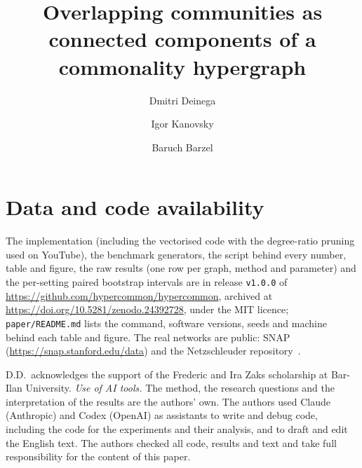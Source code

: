 \documentclass[pre,twocolumn,superscriptaddress,longbibliography,nofootinbib,floatfix]{revtex4-2}
\begin{document}
\title{Overlapping communities as connected components of a commonality hypergraph}

\author{Dmitri Deinega}
\author{Igor Kanovsky}
\author{Baruch Barzel}

\begin{abstract}

\end{abstract}

\maketitle










\section*{Data and code availability}
The implementation (including the vectorised code with the degree-ratio pruning used on
YouTube), the benchmark generators, the script behind every number, table and figure,
the raw results (one row per graph, method and parameter) and the per-setting paired
bootstrap intervals are in release \texttt{v1.0.0} of
\url{https://github.com/hypercommon/hypercommon}, archived at
\url{https://doi.org/10.5281/zenodo.24392728}, under the MIT licence;
\texttt{paper/README.md} lists the command, software versions, seeds and machine behind each table and figure.
The real networks are
public: SNAP (\url{https://snap.stanford.edu/data}) and the Netzschleuder
repository~\cite{peixoto2020netzschleuder}.

\begin{acknowledgments}
D.D.\ acknowledges the support of the Frederic and Ira Zaks scholarship at Bar-Ilan
University.
\emph{Use of AI tools.} The method, the research questions and the interpretation of the
results are the authors' own. The authors used Claude (Anthropic) and Codex (OpenAI) as
assistants to write and debug code, including the code for the experiments and their
analysis, and to draft and edit the English text. The authors checked all code, results
and text and take full responsibility for the content of this paper.
\end{acknowledgments}

\FloatBarrier
\appendix


\FloatBarrier

\end{document}
